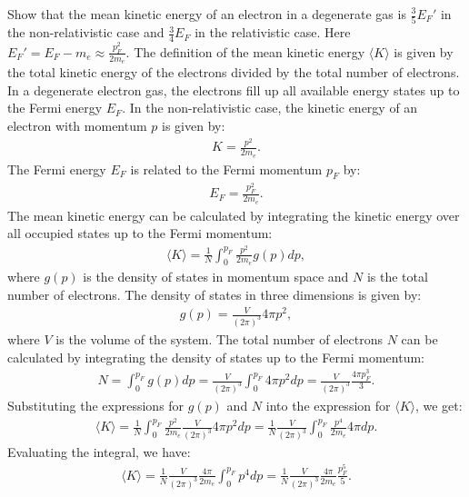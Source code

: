 \clearpage
{}
Show that the mean kinetic energy of an electron in a degenerate gas is $\frac{3}{5}E_F'$ in the non-relativistic case and $\frac{3}{4}E_F$ in the relativistic case. Here $E_F'=E_F-m_e\approx\frac{p_F^2}{2m_e}$.
\answer{}
The definition of the mean kinetic energy $\langle K \rangle$ is given by the total kinetic energy of the electrons divided by the total number of electrons. In a degenerate electron gas, the electrons fill up all available energy states up to the Fermi energy $E_F$. In the non-relativistic case, the kinetic energy of an electron with momentum $p$ is given by:
\begin{align}
    K = \frac{p^2}{2m_e}.
\end{align}
The Fermi energy $E_F$ is related to the Fermi momentum $p_F$ by:
\begin{align}
    E_F = \frac{p_F^2}{2m_e}.
\end{align}
The mean kinetic energy can be calculated by integrating the kinetic energy over all occupied states up to the Fermi momentum:
\begin{align}
    \langle K \rangle = \frac{1}{N} \int_0^{p_F} \frac{p^2}{2m_e} g(p) dp,
\end{align}where $g(p)$ is the density of states in momentum space and $N$ is the total number of electrons. The density of states in three dimensions is given by:
\begin{align}
    g(p) = \frac{V}{(2\pi)^3} 4\pi p^2,
\end{align}where $V$ is the volume of the system. The total number of electrons $N$ can be calculated by integrating the density of states up to the Fermi momentum:
\begin{align}
    N = \int_0^{p_F} g(p) dp = \frac{V}{(2\pi)^3} \int_0^{p_F} 4\pi p^2 dp = \frac{V}{(2\pi)^3} \frac{4\pi p_F^3}{3}.
\end{align}
Substituting the expressions for $g(p)$ and $N$ into the expression for $\langle K \rangle$, we get:
\begin{align}
    \langle K \rangle = \frac{1}{N} \int_0^{p_F} \frac{p^2}{2m_e} \frac{V}{(2\pi)^3} 4\pi p^2 dp = \frac{1}{N} \frac{V}{(2\pi)^3} \int_0^{p_F} \frac{p^4}{2m_e} 4\pi dp.
\end{align}
Evaluating the integral, we have:
\begin{align}
    \langle K \rangle = \frac{1}{N} \frac{V}{(2\pi)^3} \frac{4\pi}{2m_e} \int_0^{p_F} p^4 dp = \frac{1}{N} \frac{V}{(2\pi)^3} \frac{4\pi}{2m_e} \frac{p_F^5}{5}.
\end{align}
